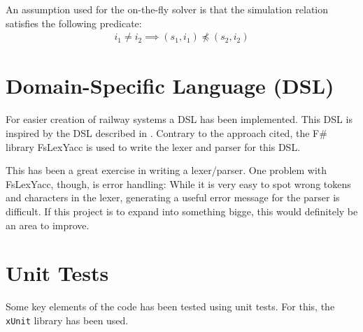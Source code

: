 An assumption used for the on-the-fly solver is that the simulation relation
satisfies the following predicate: 
\begin{align}
  i_1 \neq i_2 \implies (s_1, i_1) \not \preceq (s_2, i_2)
\end{align}


\section{Domain-Specific Language (DSL)} %

For easier creation of railway systems a DSL has been implemented. This DSL is
inspired by the DSL described in \cite{kasting2016b}. Contrary to the approach
cited, the F\# library FsLexYacc is used to write the lexer and parser for this
DSL. 

This has been a great exercise in writing a lexer/parser. One problem with
FsLexYacc, though, is error handling: While it is very easy to spot wrong tokens
and characters in the lexer, generating a useful error message for the parser is
difficult. If this project is to expand into something bigge, this would
definitely be an area to improve. 


\section{Unit Tests} %

Some key elements of the code has been tested using unit tests. For this, the
\texttt{xUnit} library has been used.  

